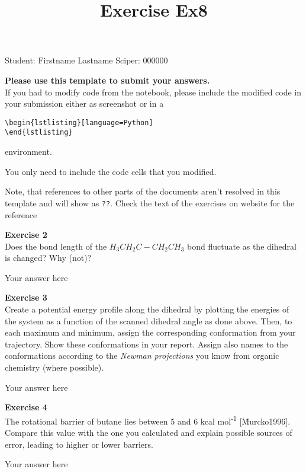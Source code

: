 \documentclass{article}
\title{Exercise Ex8}
\begin{document}
\maketitle\maketitle

Student:  Firstname Lastname    Sciper: 000000

\begin{mdframed}
\textbf{Please use this template to submit your answers.}\\
If you had to modify code from the notebook, please include the modified code in your submission either as screenshot or in a

\begin{verbatim}
\begin{lstlisting}[language=Python]
\end{lstlisting}
\end{verbatim}

environment.

You only need to include the code cells that you modified.

Note, that references to other parts of the documents aren't resolved in this template and will show as \texttt{??}. Check the text of the exercises on website for the reference
\end{mdframed}

\begin{mdframed}
\textbf{Exercise 2}\\
Does the bond length of the $H_3CH_2C -CH_2CH_3$ bond fluctuate as
the dihedral is changed? Why (not)?
\end{mdframed}

Your answer here

\begin{mdframed}
\textbf{Exercise 3}\\
Create a potential energy profile along the dihedral by plotting the
energies of the system as a function of the scanned dihedral angle as done above.
Then, to each maximum and minimum, assign the corresponding
conformation from your trajectory. Show these conformations in your
report.
Assign also names to the conformations according to the \textit{Newman
projections} you know from organic chemistry (where possible).
\end{mdframed}

Your answer here

\begin{mdframed}
\textbf{Exercise 4}\\
The rotational barrier of butane lies between 5 and 6 kcal
mol\textsuperscript{-1} [\^Murcko1996]. Compare this value with the one you calculated and explain possible sources of error, leading to higher or lower barriers.
\end{mdframed}

Your answer here



\clearpage
\end{document}
